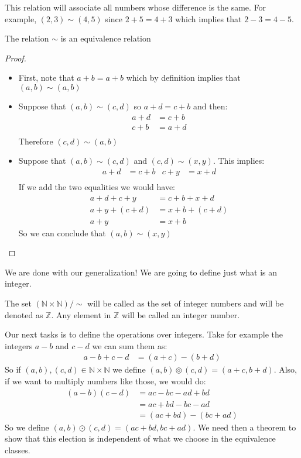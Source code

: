 \documentclass{tufte-handout}
\begin{document}
This relation will associate all numbers whose difference is the same. For example, $(2, 3) \sim (4, 5)$ since $2 + 5 = 4 + 3$ which implies that $2 - 3 = 4 - 5$. 

\begin{theorem}
	The relation $\sim$ is an equivalence relation
\end{theorem}
\begin{proof}
	\begin{itemize}
		\item First, note that $a + b = a + b$ which by definition implies that $(a, b) \sim (a, b)$
		\item Suppose that $(a, b) \sim (c, d)$ so $a + d = c + b$ and then:
		\begin{align*}
			a + d &= c + b\\
			c + b &= a + d\\ 
		\end{align*}
		Therefore $(c, d) \sim (a, b)$
		\item Suppose that $(a, b) \sim (c, d)$ and $(c, d) \sim (x, y)$. This implies:
		\begin{align*}
			a + d &= c + b & c + y &= x + d\\
		\end{align*}
		If we add the two equalities we would have:
		\begin{align*}
			a + d +c + y &= c + b + x + d\\
			a + y + (c + d) &= x + b + (c + d)\\
			a + y &= x + b
		\end{align*}
		So we can conclude that $(a, b) \sim (x, y)$
	\end{itemize}
\end{proof}

We are done with our generalization! We are going to define just what is an integer.

\begin{definition}
	The set $(\mathbb{N} \times \mathbb{N}) / \sim$ will be called as the set of integer numbers and will be denoted as $\mathbb{Z}$. Any element in $\mathbb{Z}$ will be called an integer number.
\end{definition}

Our next tasks is to define the operations over integers. Take for example the integers $a-b$ and $c-d$ we can sum them as:
\begin{align*}
	a - b + c - d &= (a + c) - (b + d)
\end{align*}
So if $(a, b), (c, d) \in \mathbb{N} \times \mathbb{N}$ we define $(a, b) \circledcirc (c, d) = (a + c, b + d)$. Also, if we want to multiply numbers like those, we would do:
\begin{align*}
	(a-b)(c-d) &= ac - bc -ad + bd\\
	&= ac + bd - bc - ad\\
	&= (ac+bd) -(bc + ad)
\end{align*}
So we define $(a, b) \odot (c, d) = (ac+bd, bc+ad)$. We need then a theorem to show that this election is independent of what we choose in the equivalence classes.
\end{document}
